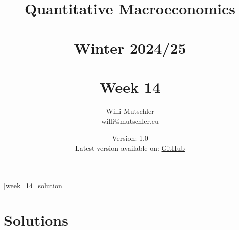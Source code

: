 
\newif\ifDisplaySolutions\DisplaySolutionstrue%


\title{Quantitative Macroeconomics\\~\\Winter 2024/25\\~\\Week 14}
\author{Willi Mutschler\\willi@mutschler.eu}
\date{Version: 1.0\\Latest version available on: \href{https://github.com/wmutschl/Quantitative-Macroeconomics/releases/latest/download/week_14.pdf}{GitHub}}
\maketitle\thispagestyle{empty}

\newpage
{}[week_14_solution]
\tableofcontents\thispagestyle{empty}\newpage

\setcounter{page}{1}
\newpage
\newpage
\newpage
\printbibliography%

\ifDisplaySolutions%
\newpage
\appendix

\section{Solutions}

\fi
